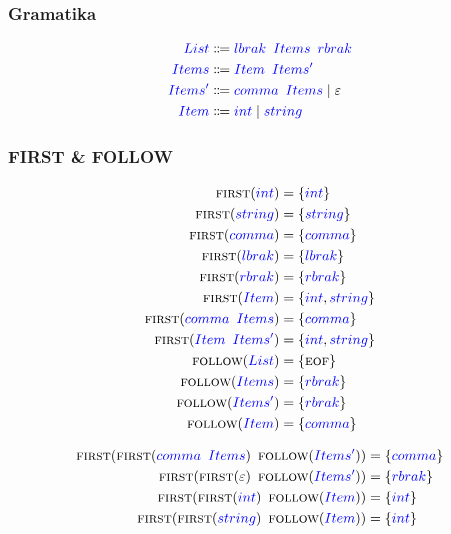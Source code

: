 \documentclass{article}
\newcommand{\FIRST}{\textsc{first}}
\newcommand{\FOLLOW}{\textsc{follow}}
\newcommand{\EOF}{\textsc{eof}}
\newcommand{\Symbol}[1]{\textcolor{blue}{#1}}
\newcommand{\Null}{\varepsilon}
\newcommand{\Arrow}{\Coloneq}
\newcommand{\Seq}{{\ \,}}
\newcommand{\Union}{\mathrel{|}}
\begin{document}
\subsubsection*{Gramatika}
\begin{equation*}
  \begin{aligned}
    \Symbol{List} &\Arrow \Symbol{lbrak} \Seq \Symbol{Items} \Seq \Symbol{rbrak}\\
    \Symbol{Items} &\Arrow \Symbol{Item} \Seq \Symbol{Items'}\\
    \Symbol{Items'} &\Arrow \Symbol{comma} \Seq \Symbol{Items} \Union \Null\\
    \Symbol{Item} &\Arrow \Symbol{int} \Union \Symbol{string}
  \end{aligned}
\end{equation*}

\subsubsection*{FIRST \& FOLLOW}
\begin{equation*}
  \begin{aligned}
    \FIRST(\Symbol{int}) &= \{\Symbol{int}\}\\
    \FIRST(\Symbol{string}) &= \{\Symbol{string}\}\\
    \FIRST(\Symbol{comma}) &= \{\Symbol{comma}\}\\
    \FIRST(\Symbol{lbrak}) &= \{\Symbol{lbrak}\}\\
    \FIRST(\Symbol{rbrak}) &= \{\Symbol{rbrak}\}\\
    \FIRST(\Symbol{Item}) &= \{\Symbol{int}, \Symbol{string}\}\\
    \FIRST(\Symbol{comma} \Seq \Symbol{Items}) &= \{\Symbol{comma}\}\\
    \FIRST(\Symbol{Item} \Seq \Symbol{Items'}) &= \{\Symbol{int}, \Symbol{string}\}\\
    \FOLLOW(\Symbol{List}) &= \{\EOF\}\\
    \FOLLOW(\Symbol{Items}) &= \{\Symbol{rbrak}\}\\
    \FOLLOW(\Symbol{Items'}) &= \{\Symbol{rbrak}\}\\
    \FOLLOW(\Symbol{Item}) &= \{\Symbol{comma}\}
  \end{aligned}
\end{equation*}

\begin{equation*}
  \begin{aligned}
    \FIRST(\FIRST(\Symbol{comma} \Seq \Symbol{Items}) \Seq \FOLLOW(\Symbol{Items'})) &= \{\Symbol{comma}\}\\
    \FIRST(\FIRST(\Null) \Seq \FOLLOW(\Symbol{Items'})) &= \{\Symbol{rbrak}\}\\
    \FIRST(\FIRST(\Symbol{int}) \Seq \FOLLOW(\Symbol{Item})) &= \{\Symbol{int}\}\\
    \FIRST(\FIRST(\Symbol{string}) \Seq \FOLLOW(\Symbol{Item})) &= \{\Symbol{int}\}\\
  \end{aligned}
\end{equation*}
\end{document}

